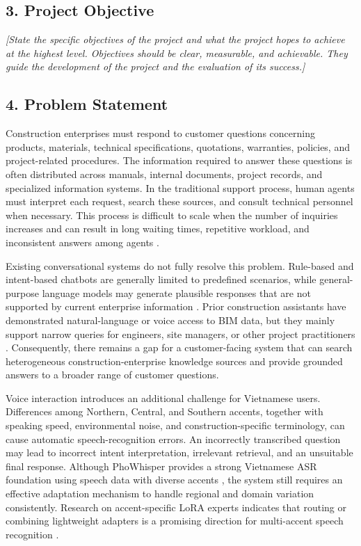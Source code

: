 \documentclass[11pt,a4paper]{article}
\newcommand{\guidance}[1]{%
  {\color{guidanceblue}\itshape [#1]\par}%
}
\begin{document}
\subsection{3. Project Objective}
\guidance{State the specific objectives of the project and what the project
hopes to achieve at the highest level. Objectives should be clear, measurable,
and achievable. They guide the development of the project and the evaluation
of its success.}

\subsection{4. Problem Statement}

Construction enterprises must respond to customer questions concerning
products, materials, technical specifications, quotations, warranties,
policies, and project-related procedures. The information required to answer
these questions is often distributed across manuals, internal documents,
project records, and specialized information systems. In the traditional
support process, human agents must interpret each request, search these sources,
and consult technical personnel when necessary. This process is difficult to
scale when the number of inquiries increases and can result in long waiting
times, repetitive workload, and inconsistent answers among agents
\cite{gans2003,nabavi2023}.

Existing conversational systems do not fully resolve this problem. Rule-based
and intent-based chatbots are generally limited to predefined scenarios, while
general-purpose language models may generate plausible responses that are not
supported by current enterprise information \cite{suhaili2021,lewis2020}. Prior
construction assistants have demonstrated natural-language or voice access to
BIM data, but they mainly support narrow queries for engineers, site managers,
or other project practitioners \cite{shin2021,lin2023,zheng2023}. Consequently,
there remains a gap for a customer-facing system that can search heterogeneous
construction-enterprise knowledge sources and provide grounded answers to a
broader range of customer questions.

Voice interaction introduces an additional challenge for Vietnamese users.
Differences among Northern, Central, and Southern accents, together with
speaking speed, environmental noise, and construction-specific terminology,
can cause automatic speech-recognition errors. An incorrectly transcribed
question may lead to incorrect intent interpretation, irrelevant retrieval,
and an unsuitable final response. Although PhoWhisper provides a strong
Vietnamese ASR foundation using speech data with diverse accents
\cite{le2024}, the system still requires an effective adaptation mechanism to
handle regional and domain variation consistently. Research on accent-specific
LoRA experts indicates that routing or combining lightweight adapters is a
promising direction for multi-accent speech recognition \cite{bagat2025}.
\end{document}
